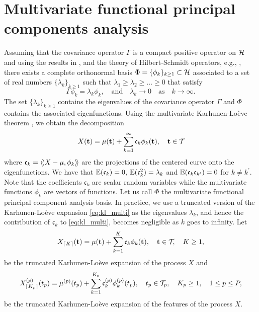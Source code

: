\section{Multivariate functional principal components analysis} %
\label{sec:functional_principal_components_analysis}

Assuming that the covariance operator $\Gamma$ is a compact positive operator on $\mathcal{H}$ and using the results in \cite{happMultivariateFunctionalPrincipal2018a}, and the theory of Hilbert-Schmidt operators, e.g., \cite{reedMethodsModernMathematical1980}, there exists a complete orthonormal basis 
$\Phi = \{\phi_k\}_{k \geq 1} \subset \mathcal{H}$ associated to a set of real numbers $\{\lambda_k\}_{k \geq 1}$ such that $\lambda_1 \geq \lambda_2 \geq \dots \geq 0$ that satisfy
\begin{equation}\label{eq:eigendecomposition}
    \Gamma \phi_k = \lambda_k \phi_k, \quad\text{and}\quad \lambda_k \longrightarrow 0 \quad\text{as}\quad k \longrightarrow \infty.
\end{equation}
The set $\{\lambda_k\}_{k \geq 1}$ contains the eigenvalues of the covariance operator $\Gamma$ and $\Phi$ contains the associated eigenfunctions. Using the multivariate Karhunen-Loève theorem \citep{happMultivariateFunctionalPrincipal2018a}, we obtain the decomposition
\begin{equation}\label{eq:kl_multi}
    X(\mathbf{t}) = \mu(\mathbf{t}) + \sum_{k = 1}^\infty \mathfrak{c}_k \phi_k(\mathbf{t}), \quad \mathbf{t} \in \mathcal{T}_{}
\end{equation}
where $\mathfrak{c}_{k} = \langle\!\langle X - \mu, \phi_k\rangle\!\rangle$ are the projections of the centered curve onto the eigenfunctions. We have that $\mathbb{E}(\mathfrak{c}_{k}) = 0$, $\mathbb{E}(\mathfrak{c}_{k}^2) = \lambda_k$ and $\mathbb{E}(\mathfrak{c}_{k}\mathfrak{c}_{k^\prime}) = 0$ for $k \neq k^\prime$. Note that the coefficients $\mathfrak{c}_k$ are scalar random variables while the multivariate functions $\phi_k$ are vectors of functions. Let us call $\Phi$ the multivariate functional principal component analysis basis. In practice, we use a truncated version of the Karhunen-Loève expansion \eqref{eq:kl_multi} as the eigenvalues $\lambda_k$, and hence the contribution of $\mathfrak{c}_k$ to \eqref{eq:kl_multi}, becomes negligible as $k$ goes to infinity. Let
\begin{equation}\label{eq:kl_multi_trunc}
    X_{\lceil K \rceil}(\mathbf{t}) = \mu(\mathbf{t}) + \sum_{k = 1}^K \mathfrak{c}_k \phi_k(\mathbf{t}), \quad \mathbf{t} \in \mathcal{T}_{}, \quad K \geq 1,
\end{equation}
be the truncated Karhunen-Loève expansion of the process $X$ and
\begin{equation}\label{eq:kl_multi_trunc_comp}
    X_{\lceil K_p \rceil}^{(p)}(t_p) = \mu^{(p)}(t_p) + \sum_{k = 1}^{K_p} \mathfrak{c}_k^{(p)} \phi_k^{(p)}(t_p), \quad t_p \in \mathcal{T}_{p}, \quad K_p \geq 1, \quad 1 \leq p \leq P,
\end{equation}
be the truncated Karhunen-Loève expansion of the features of the process $X$.



